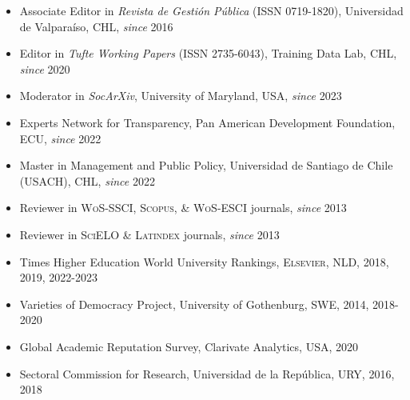 





\begin{publications}

\begin{itemize}
\item{\small Associate Editor in {\itshape Revista de Gestión Pública} (ISSN 0719-1820), Universidad de Valparaíso, CHL, {\itshape since} 2016}
\item{\small Editor in {\itshape Tufte Working Papers} (ISSN 2735-6043), Training Data Lab, CHL, {\itshape since} 2020}
\item{\small Moderator in {\itshape SocArXiv}, University of Maryland, USA, {\itshape since} 2023}
\item{\small Experts Network for Transparency, Pan American Development Foundation, ECU, {\itshape since} 2022}
\item{\small Master in Management and Public Policy, Universidad de Santiago de Chile (USACH), CHL, {\itshape since} 2022}
\item{\small Reviewer in {\scshape WoS-SSCI}, {\scshape Scopus}, \& {\scshape WoS-ESCI} journals, {\itshape since} 2013}
\item{\small Reviewer in {\scshape SciELO} \& {\scshape Latindex} journals, {\itshape since} 2013}
\item{\small Times Higher Education World University Rankings, {\scshape Elsevier}, NLD, 2018, 2019, 2022-2023}
\item{\small Varieties of Democracy Project, University of Gothenburg, SWE, 2014, 2018-2020}
\item{\small Global Academic Reputation Survey, Clarivate Analytics, USA, 2020}
\item{\small Sectoral Commission for Research, Universidad de la República, URY, 2016, 2018}
\end{itemize}

\vspace{1mm}
\end{publications}
